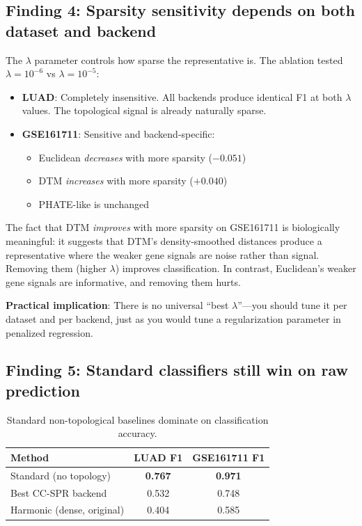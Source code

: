 \documentclass[11pt]{article}
\begin{document}
\subsection{Finding 4: Sparsity sensitivity depends on both dataset and backend}

The $\lambda$ parameter controls how sparse the representative is. The ablation tested $\lambda = 10^{-6}$ vs $\lambda = 10^{-5}$:

\begin{itemize}
    \item \textbf{LUAD}: Completely insensitive. All backends produce identical F1 at both $\lambda$ values. The topological signal is already naturally sparse.
    \item \textbf{GSE161711}: Sensitive and backend-specific:
    \begin{itemize}
        \item Euclidean \emph{decreases} with more sparsity ($-0.051$)
        \item DTM \emph{increases} with more sparsity ($+0.040$)
        \item PHATE-like is unchanged
    \end{itemize}
\end{itemize}

\begin{takeaway}
The fact that DTM \emph{improves} with more sparsity on GSE161711 is biologically meaningful: it suggests that DTM's density-smoothed distances produce a representative where the weaker gene signals are noise rather than signal. Removing them (higher $\lambda$) improves classification. In contrast, Euclidean's weaker gene signals are informative, and removing them hurts.

\textbf{Practical implication}: There is no universal ``best $\lambda$''---you should tune it per dataset and per backend, just as you would tune a regularization parameter in penalized regression.
\end{takeaway}

\subsection{Finding 5: Standard classifiers still win on raw prediction}

\begin{table}[h]
\centering
\begin{tabular}{lcc}
\toprule
\textbf{Method} & \textbf{LUAD F1} & \textbf{GSE161711 F1} \\
\midrule
Standard (no topology) & \textbf{0.767} & \textbf{0.971} \\
Best CC-SPR backend & 0.532 & 0.748 \\
Harmonic (dense, original) & 0.404 & 0.585 \\
\bottomrule
\end{tabular}
\caption{Standard non-topological baselines dominate on classification accuracy.}
\end{table}
\end{document}
